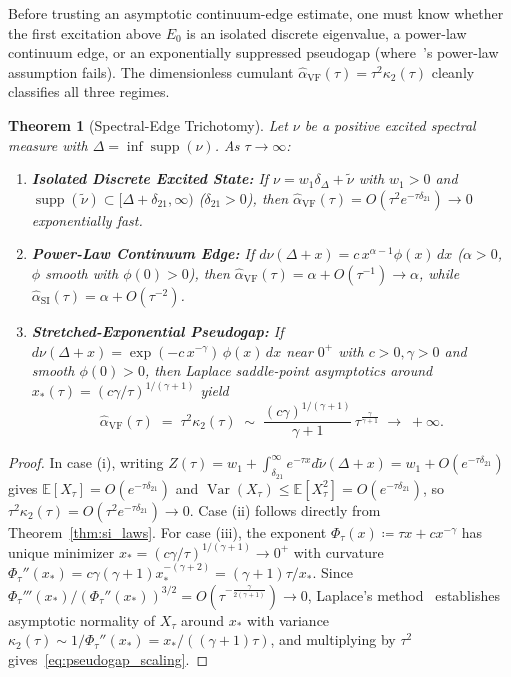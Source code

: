 \documentclass[11pt,a4paper]{article}
\newtheorem{theorem}{Theorem}[section]
\theoremstyle{definition}
\newcommand{\E}{\mathbb{E}}
\newcommand{\Var}{\operatorname{Var}}
\begin{document}
Before trusting an asymptotic continuum-edge estimate, one must know whether the first excitation above $E_0$ is an isolated discrete eigenvalue, a power-law continuum edge, or an exponentially suppressed pseudogap (where~\cite{Karapetyan2026Beyond}'s power-law assumption fails). The dimensionless cumulant $\widehat{\alpha}_{\mathrm{VF}}(\tau) = \tau^2 \kappa_2(\tau)$ cleanly classifies all three regimes.

\begin{theorem}[Spectral-Edge Trichotomy]
\label{thm:trichotomy}
Let $\nu$ be a positive excited spectral measure with $\Delta = \inf\operatorname{supp}(\nu)$. As $\tau \to \infty$:
\begin{enumerate}[label=(\roman*),leftmargin=2em,itemsep=2pt]
  \item \textbf{Isolated Discrete Excited State:} If $\nu = w_1 \delta_\Delta + \tilde{\nu}$ with $w_1 > 0$ and $\operatorname{supp}(\tilde{\nu}) \subset [\Delta + \delta_{21}, \infty)$ ($\delta_{21} > 0$), then $\widehat{\alpha}_{\mathrm{VF}}(\tau) = O(\tau^2 e^{-\tau \delta_{21}}) \to 0$ exponentially fast.
  \item \textbf{Power-Law Continuum Edge:} If $d\nu(\Delta+x) = c\,x^{\alpha-1}\phi(x)\,dx$ ($\alpha > 0$, $\phi$ smooth with $\phi(0) > 0$), then $\widehat{\alpha}_{\mathrm{VF}}(\tau) = \alpha + O(\tau^{-1}) \to \alpha$, while $\widehat{\alpha}_{\mathrm{SI}}(\tau) = \alpha + O(\tau^{-2})$.
  \item \textbf{Stretched-Exponential Pseudogap:} If $d\nu(\Delta+x) = \exp(-c\, x^{-\gamma})\,\phi(x)\,dx$ near $0^+$ with $c > 0, \gamma > 0$ and smooth $\phi(0) > 0$, then Laplace saddle-point asymptotics around $x_*(\tau) = (c\gamma/\tau)^{1/(\gamma+1)}$ yield
  \begin{equation}
    \widehat{\alpha}_{\mathrm{VF}}(\tau) \;=\; \tau^2 \kappa_2(\tau)
    \;\sim\; \frac{(c\gamma)^{1/(\gamma+1)}}{\gamma + 1}\, \tau^{\frac{\gamma}{\gamma+1}}
    \;\longrightarrow\; +\infty.
    \label{eq:pseudogap_scaling}
  \end{equation}
\end{enumerate}
\end{theorem}

\begin{proof}
In case (i), writing $Z(\tau) = w_1 + \int_{\delta_{21}}^\infty e^{-\tau x} d\tilde{\nu}(\Delta+x) = w_1 + O(e^{-\tau\delta_{21}})$ gives $\E[X_\tau] = O(e^{-\tau\delta_{21}})$ and $\Var(X_\tau) \le \E[X_\tau^2] = O(e^{-\tau\delta_{21}})$, so $\tau^2\kappa_2(\tau) = O(\tau^2 e^{-\tau\delta_{21}}) \to 0$. Case (ii) follows directly from Theorem~\ref{thm:si_laws}. For case (iii), the exponent $\Phi_\tau(x) \coloneqq \tau x + c x^{-\gamma}$ has unique minimizer $x_* = (c\gamma/\tau)^{1/(\gamma+1)} \to 0^+$ with curvature $\Phi_\tau''(x_*) = c\gamma(\gamma+1) x_*^{-(\gamma+2)} = (\gamma+1)\tau / x_*$. Since $\Phi_\tau'''(x_*) / (\Phi_\tau''(x_*))^{3/2} = O(\tau^{-\frac{\gamma}{2(\gamma+1)}}) \to 0$, Laplace's method~\cite{Erdelyi1956Asymptotic} establishes asymptotic normality of $X_\tau$ around $x_*$ with variance $\kappa_2(\tau) \sim 1/\Phi_\tau''(x_*) = x_* / ((\gamma+1)\tau)$, and multiplying by $\tau^2$ gives~\eqref{eq:pseudogap_scaling}.
\end{proof}
\end{document}
